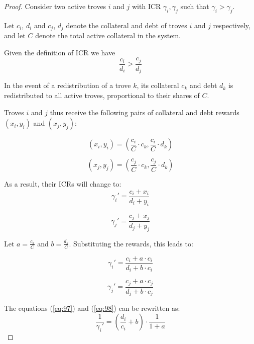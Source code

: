 \documentclass[reqno]{article}
\begin{document}
\begin{proof}
Consider two active troves $i$ and $j$ with ICR $\gamma_i,  \gamma_j$ such that $\gamma_i > \gamma_j$.

Let $c_i$, $d_i$ and $c_j$, $d_j$ denote the collateral and debt of troves $i$ and $j$ respectively, and let $C$ denote the total active collateral in the system.

Given the definition of ICR we have 
\begin{equation} \label{eq:92}
    \frac{c_i}{d_i}>\frac{c_j}{d_j}
\end{equation}

In the event of a redistribution of a trove $k$, its collateral $c_k$ and debt $d_k$ is redistributed to all active troves, proportional to their shares of $C$.

Troves $i$ and $j$ thus receive the following pairs of collateral and debt rewards $(x_i, y_i)$ and $(x_j, y_j)$:

\begin{equation} 
  (x_i, y_i) = \left(\frac{c_i}{C} \cdot c_k, \frac{c_i}{C} \cdot d_k\right)
\end{equation}

\begin{equation} 
   (x_j, y_j) = \left(\frac{c_j}{C} \cdot c_k, \frac{c_j}{C} \cdot d_k\right)
\end{equation}

As a result, their ICRs will change to:
\begin{equation} 
  \gamma_i' = \frac{c_i + x_i}{d_i + y_i} 
\end{equation}

\begin{equation} 
  \gamma_j' = \frac{c_j + x_j}{d_j + y_j} 
\end{equation}

Let $a = \frac{c_k}{C}$ and $b = \frac{d_k}{C}$. Substituting the rewards, this leads to:

\begin{equation} \label{eq:97}
  \gamma_i' = \frac{c_i + a \cdot c_i}{d_i + b \cdot c_i} 
\end{equation}

\begin{equation} \label{eq:98}
  \gamma_j' = \frac{c_j + a \cdot c_j}{d_j + b \cdot c_j} 
\end{equation}

The equations (\ref{eq:97}) and (\ref{eq:98}) can be rewritten as:
\begin{equation} \label{eq:a}
  \frac{1}{\gamma_i'} = \left(\frac{d_i}{c_i}+b\right) \cdot \frac{1}{1 + a}  
\end{equation}


\end{proof}
\end{document}
